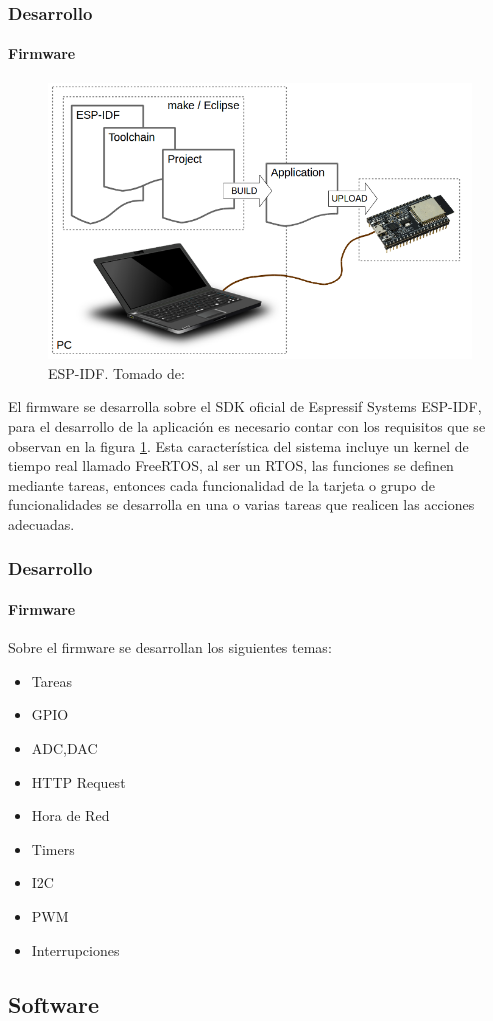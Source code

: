\begin{frame}
\frametitle{Desarrollo}
\framesubtitle{Firmware}
\begin{figure}
	\centering
	\caption{ESP-IDF. Tomado de: \cite{ES}}
	\label{fig:what-you-need}
	\includegraphics[width=0.7\linewidth]{Imagenes/what-you-need}
\end{figure}
El firmware se desarrolla sobre el SDK oficial de Espressif Systems ESP-IDF, para el desarrollo de la aplicación es necesario contar con los requisitos que se observan en la figura \ref{fig:what-you-need}. Esta característica del sistema incluye un kernel de tiempo real llamado FreeRTOS, al ser un RTOS, las funciones se definen mediante tareas, entonces cada funcionalidad de la tarjeta o grupo de funcionalidades se desarrolla en una o varias tareas que realicen las acciones adecuadas.\\
\end{frame}

\begin{frame}
\frametitle{Desarrollo}
\framesubtitle{Firmware}

Sobre el firmware se desarrollan los siguientes temas:

\begin{itemize}
	\item Tareas
	\item GPIO
	\item ADC,DAC
	\item HTTP Request
	\item Hora de Red
	\item Timers
	\item I2C
	\item PWM
	\item Interrupciones
\end{itemize}

\end{frame}

\subsection{Software}

